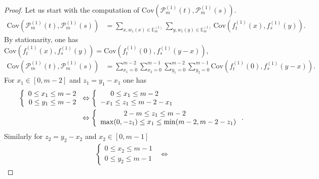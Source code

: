 \documentclass[12pt]{article}
\theoremstyle{Theorem}
\begin{document}
\begin{proof}
Let us start with the computation of $\text{Cov}(\mathcal{P}_{m}^{\scriptscriptstyle (1)}(t), \mathcal{P}_{m}^{\scriptscriptstyle (1)}(s))$. 
\begin{align*}
\text{Cov}(\mathcal{P}_{m}^{\scriptscriptstyle (1)}(t), \mathcal{P}_{m}^{\scriptscriptstyle (1)}(s))& = \sum_{x, w_{1}(x) \in \mathbb{E}^{\scriptscriptstyle (1)}_{m}} \sum_{y, w_{1}(y) \in \mathbb{E}^{\scriptscriptstyle (1)}_{m}} \text{Cov}\left(f_{t}^{\scriptscriptstyle (1)}(x), f_{s}^{\scriptscriptstyle (1)}(y) \right).
\end{align*}
By stationarity, one has $\text{Cov}\left(f_{t}^{\scriptscriptstyle (1)}(x), f_{s}^{\scriptscriptstyle (1)}(y) \right)= \text{Cov}\left(f_{t}^{\scriptscriptstyle (1)}(0), f_{s}^{\scriptscriptstyle (1)}(y-x) \right)$, 
\begin{align*}
\text{Cov}\left(\mathcal{P}_{m}^{\scriptscriptstyle (1)}(t),\mathcal{P}_{m}^{\scriptscriptstyle (1)}(s) \right) & = \sum_{x_1 = 0}^{m-2}\sum_{x_2 = 0}^{m-1}\sum_{y_1 = 0}^{m-2}\sum_{y_2 = 0}^{m-1} \text{Cov}\left(f_{t}^{\scriptscriptstyle (1)}(0), f_{s}^{ \scriptscriptstyle (1)}(y-x) \right).
\end{align*}
For $x_1 \in [0,m-2]$ and $z_1 = y_1 - x_1$ one has
\begin{align*} 
\left\{
\begin{array}{rcl}
0 \leq x_1 \leq m-2 \\
0 \leq y_1 \leq m-2 
\end{array}\right.& \Leftrightarrow  \left\{ \begin{array}{rcl}
0 \leq x_1 \leq m-2 \hspace{0.7cm} \\
-x_1 \leq z_1 \leq m-2 - x_1
\end{array}\right. \\
& \Leftrightarrow  \left\{
\begin{array}{rcl}
2-m \leq z_1 \leq m-2 \hspace{2.5cm}  \\
\max(0, -z_1) \leq x_1 \leq \min(m-2 , m-2-z_1)
\end{array}\right..
\end{align*} 
Similarly for $z_2 = y_2 - x_2$ and $x_2 \in [0, m-1]$
\begin{align*}
 \left\{
\begin{array}{rcl}
0 \leq x_2 \leq m-1 \\
0 \leq y_2 \leq m-1 
\end{array}\right. & \Leftrightarrow

\end{align*}
\end{proof}
\end{document}
